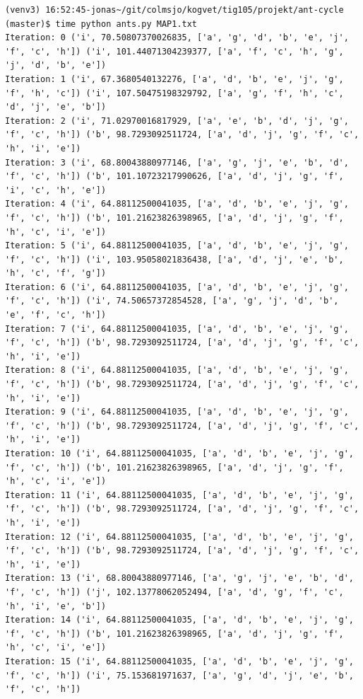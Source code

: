 \documentclass[11pt]{article}
\begin{document}
\begin{lstlisting}
(venv3) 16:52:45-jonas~/git/colmsjo/kogvet/tig105/projekt/ant-cycle (master)$ time python ants.py MAP1.txt
Iteration: 0 ('i', 70.50807370026835, ['a', 'g', 'd', 'b', 'e', 'j', 'f', 'c', 'h']) ('i', 101.44071304239377, ['a', 'f', 'c', 'h', 'g', 'j', 'd', 'b', 'e'])
Iteration: 1 ('i', 67.3680540132276, ['a', 'd', 'b', 'e', 'j', 'g', 'f', 'h', 'c']) ('i', 107.50475198329792, ['a', 'g', 'f', 'h', 'c', 'd', 'j', 'e', 'b'])
Iteration: 2 ('i', 71.02970016817929, ['a', 'e', 'b', 'd', 'j', 'g', 'f', 'c', 'h']) ('b', 98.7293092511724, ['a', 'd', 'j', 'g', 'f', 'c', 'h', 'i', 'e'])
Iteration: 3 ('i', 68.80043880977146, ['a', 'g', 'j', 'e', 'b', 'd', 'f', 'c', 'h']) ('b', 101.10723217990626, ['a', 'd', 'j', 'g', 'f', 'i', 'c', 'h', 'e'])
Iteration: 4 ('i', 64.88112500041035, ['a', 'd', 'b', 'e', 'j', 'g', 'f', 'c', 'h']) ('b', 101.21623826398965, ['a', 'd', 'j', 'g', 'f', 'h', 'c', 'i', 'e'])
Iteration: 5 ('i', 64.88112500041035, ['a', 'd', 'b', 'e', 'j', 'g', 'f', 'c', 'h']) ('i', 103.95058021836438, ['a', 'd', 'j', 'e', 'b', 'h', 'c', 'f', 'g'])
Iteration: 6 ('i', 64.88112500041035, ['a', 'd', 'b', 'e', 'j', 'g', 'f', 'c', 'h']) ('i', 74.50657372854528, ['a', 'g', 'j', 'd', 'b', 'e', 'f', 'c', 'h'])
Iteration: 7 ('i', 64.88112500041035, ['a', 'd', 'b', 'e', 'j', 'g', 'f', 'c', 'h']) ('b', 98.7293092511724, ['a', 'd', 'j', 'g', 'f', 'c', 'h', 'i', 'e'])
Iteration: 8 ('i', 64.88112500041035, ['a', 'd', 'b', 'e', 'j', 'g', 'f', 'c', 'h']) ('b', 98.7293092511724, ['a', 'd', 'j', 'g', 'f', 'c', 'h', 'i', 'e'])
Iteration: 9 ('i', 64.88112500041035, ['a', 'd', 'b', 'e', 'j', 'g', 'f', 'c', 'h']) ('b', 98.7293092511724, ['a', 'd', 'j', 'g', 'f', 'c', 'h', 'i', 'e'])
Iteration: 10 ('i', 64.88112500041035, ['a', 'd', 'b', 'e', 'j', 'g', 'f', 'c', 'h']) ('b', 101.21623826398965, ['a', 'd', 'j', 'g', 'f', 'h', 'c', 'i', 'e'])
Iteration: 11 ('i', 64.88112500041035, ['a', 'd', 'b', 'e', 'j', 'g', 'f', 'c', 'h']) ('b', 98.7293092511724, ['a', 'd', 'j', 'g', 'f', 'c', 'h', 'i', 'e'])
Iteration: 12 ('i', 64.88112500041035, ['a', 'd', 'b', 'e', 'j', 'g', 'f', 'c', 'h']) ('b', 98.7293092511724, ['a', 'd', 'j', 'g', 'f', 'c', 'h', 'i', 'e'])
Iteration: 13 ('i', 68.80043880977146, ['a', 'g', 'j', 'e', 'b', 'd', 'f', 'c', 'h']) ('j', 102.13778062052494, ['a', 'd', 'g', 'f', 'c', 'h', 'i', 'e', 'b'])
Iteration: 14 ('i', 64.88112500041035, ['a', 'd', 'b', 'e', 'j', 'g', 'f', 'c', 'h']) ('b', 101.21623826398965, ['a', 'd', 'j', 'g', 'f', 'h', 'c', 'i', 'e'])
Iteration: 15 ('i', 64.88112500041035, ['a', 'd', 'b', 'e', 'j', 'g', 'f', 'c', 'h']) ('i', 75.153681971637, ['a', 'g', 'd', 'j', 'e', 'b', 'f', 'c', 'h'])

\end{lstlisting}
\end{document}
